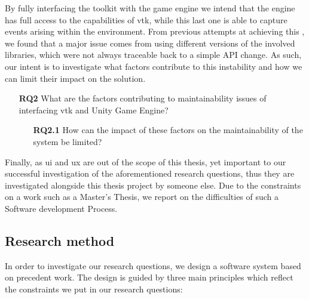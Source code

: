 By fully interfacing the toolkit with the game engine we intend that the engine has full access to the capabilities of \acrshort{vtk}, while this last one is able to capture events arising within the environment. From previous attempts at achieving this \cite{dreuning_visual_2016, kruis_creating_2017, schutte_virtual_2018, wheeler_virtual_2018}, we found that a major issue comes from using different versions of the involved libraries, which were not always traceable back to a simple API change. As such, our intent is to investigate what factors contribute to this instability and how we can limit their impact on the solution.

\begin{itemize}[leftmargin=1.5truecm]
    \item[\textbf{RQ2}] What are the factors contributing to maintainability issues of interfacing \acrlong{vtk} and Unity Game Engine?
    \begin{itemize}[leftmargin=1.5truecm]
        \item[\textbf{RQ2.1}] How can the impact of these factors on the maintainability of the system be limited?
    \end{itemize}
\end{itemize}

Finally, as \acrshort{ui} and \acrshort{ux} are out of the scope of this thesis, yet important to our successful investigation of the aforementioned research questions, thus they are investigated alongside this thesis project by someone else. Due to the constraints on a work such as a Master's Thesis, we report on the difficulties of such a Software development Process.

\subsection{Research method}

In order to investigate our research questions, we design a software system based on precedent work. The design is guided by three main principles which reflect the constraints we put in our research questions:

